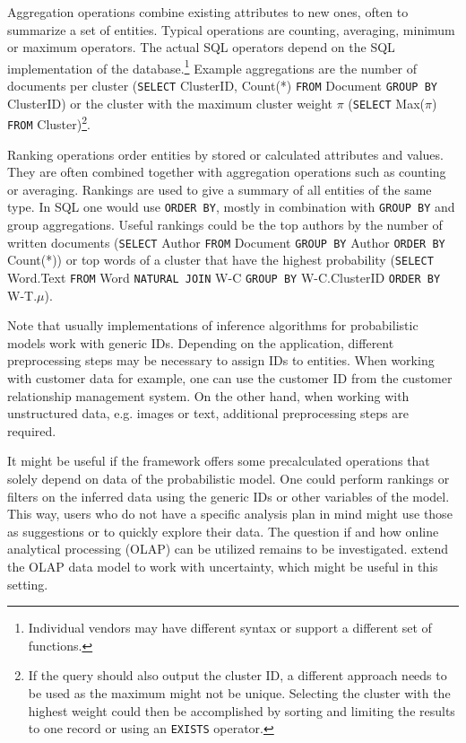 Aggregation operations combine existing attributes to new ones, often to summarize a set of entities. Typical operations are counting, averaging, minimum or maximum operators. The actual SQL operators depend on the SQL implementation of the database.\footnote{Individual vendors may have different syntax or support a different set of functions.} Example aggregations are the number of documents per cluster (\texttt{SELECT} ClusterID, Count(*) \texttt{FROM} Document \texttt{GROUP BY} ClusterID) or the cluster with the maximum cluster weight $\pi$ (\texttt{SELECT} Max($\pi$) \texttt{FROM} Cluster)\footnote{If the query should also output the cluster ID, a different approach needs to be used as the maximum might not be unique. Selecting the cluster with the highest weight could then be accomplished by sorting and limiting the results to one record or using an \texttt{EXISTS} operator.}.

Ranking operations order entities by stored or calculated attributes and values. They are often combined together with aggregation operations such as counting or averaging. Rankings are used to give a summary of all entities of the same type. In SQL one would use \texttt{ORDER BY}, mostly in combination with \texttt{GROUP BY} and group aggregations. Useful rankings could be the top authors by the number of written documents (\texttt{SELECT} Author \texttt{FROM} Document \texttt{GROUP BY} Author \texttt{ORDER BY} Count(*)) or top words of a cluster that have the highest probability (\texttt{SELECT} Word.Text \texttt{FROM} Word \texttt{NATURAL JOIN} W-C \texttt{GROUP BY} W-C.ClusterID \texttt{ORDER BY} W-T.$\mu$).

Note that usually implementations of inference algorithms for probabilistic models work with generic IDs. Depending on the application, different preprocessing steps may be necessary to assign IDs to entities. When working with customer data for example, one can use the customer ID from the customer relationship management system. On the other hand, when working with unstructured data, e.g. images or text, additional preprocessing steps are required.

It might be useful if the framework offers some precalculated operations that solely depend on data of the probabilistic model. One could perform rankings or filters on the inferred data using the generic IDs or other variables of the model. This way, users who do not have a specific analysis plan in mind might use those as suggestions or to quickly explore their data. The question if and how online analytical processing (OLAP) can be utilized remains to be investigated. \textcite{burdick2007olap} extend the OLAP data model to work with uncertainty, which might be useful in this setting.
